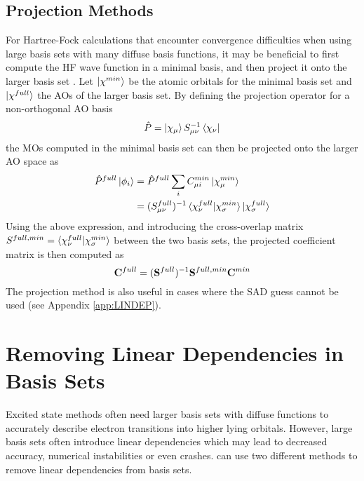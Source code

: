 \section{Projection Methods}

For Hartree-Fock calculations that encounter convergence difficulties when using large basis sets with many diffuse basis functions, it may be beneficial to first compute the HF wave function in a minimal basis, and then project it onto the larger basis set \cite{Leh2019}. Let $\ket{\smash{\chi^{min}}}$ be the atomic orbitals for the minimal basis set and $\ket{\smash{\chi^{full}}}$ the AOs of the larger basis set. By defining the projection operator for a non-orthogonal AO basis
\begin{equation}
\hat{P} = \ket{\smash{\chi_{\mu}}} S_{\mu\nu}^{-1} \bra{\smash{\chi_{\nu}}}
\end{equation}
\noindent the MOs computed in the minimal basis set can then be projected onto the larger AO space as
\begin{equation}
\begin{split}
\hat{P}^{full}\ket{\smash{\phi_i}} &= \hat{P}^{full}\sum_i C^{min}_{\mu i} \ket{\smash{\chi^{min}_\mu}} \\
	&= (S^{full}_{\mu\nu})^{-1} \bra{\smash{\chi^{full}_{\nu}}}\ket{\smash{\chi^{min}_{\sigma}}} \ket{\smash{\chi^{full}_{\sigma}}}
\end{split} 
\end{equation}
\noindent Using the above expression, and introducing the cross-overlap matrix $S^{full,min} = \bra{\smash{\chi^{full}_{\nu}}}\ket{\smash{\chi^{min}_{\sigma}}}$ between the two basis sets, the projected coefficient matrix is then computed as
\begin{equation}
\mathbf{C}^{full} = (\mathbf{S}^{full})^{-1} \mathbf{S}^{full,min} \mathbf{C}^{min} 
\end{equation}
\noindent The projection method is also useful in cases where the SAD guess cannot be used (see Appendix \ref{app:LINDEP}). 

\chapter{Removing Linear Dependencies in Basis Sets \label{app:LINDEP}}

Excited state methods often need larger basis sets with diffuse functions to accurately describe electron transitions into higher lying orbitals. However, large basis sets often introduce linear dependencies which may lead to decreased accuracy, numerical instabilities or even crashes. \mchem{} can use two different methods to remove linear dependencies from basis sets.

